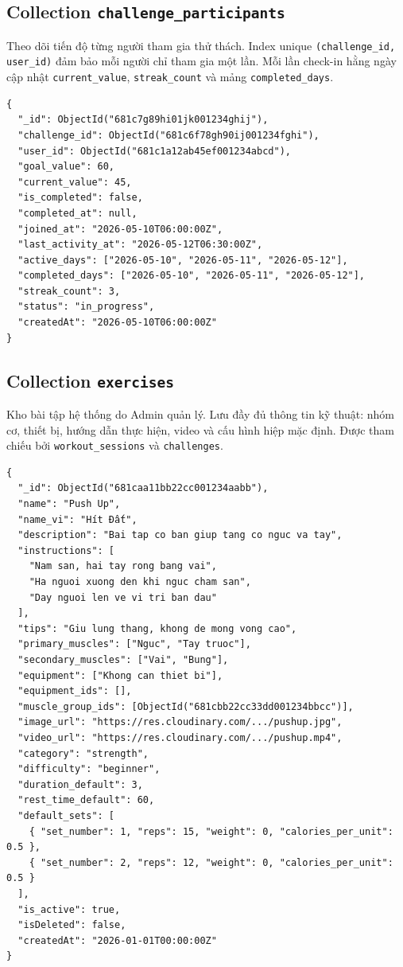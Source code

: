 \subsection{Collection \texttt{challenge\_participants}}
\label{subsec:col_challenge_participants}

Theo dõi tiến độ từng người tham gia thử thách. Index unique \texttt{(challenge\_id, user\_id)} đảm bảo mỗi người chỉ tham gia một lần. Mỗi lần check-in hằng ngày cập nhật \texttt{current\_value}, \texttt{streak\_count} và mảng \texttt{completed\_days}.

\begin{verbatim}
{
  "_id": ObjectId("681c7g89hi01jk001234ghij"),
  "challenge_id": ObjectId("681c6f78gh90ij001234fghi"),
  "user_id": ObjectId("681c1a12ab45ef001234abcd"),
  "goal_value": 60,
  "current_value": 45,
  "is_completed": false,
  "completed_at": null,
  "joined_at": "2026-05-10T06:00:00Z",
  "last_activity_at": "2026-05-12T06:30:00Z",
  "active_days": ["2026-05-10", "2026-05-11", "2026-05-12"],
  "completed_days": ["2026-05-10", "2026-05-11", "2026-05-12"],
  "streak_count": 3,
  "status": "in_progress",
  "createdAt": "2026-05-10T06:00:00Z"
}
\end{verbatim}

\subsection{Collection \texttt{exercises}}
\label{subsec:col_exercises}

Kho bài tập hệ thống do Admin quản lý. Lưu đầy đủ thông tin kỹ thuật: nhóm cơ, thiết bị, hướng dẫn thực hiện, video và cấu hình hiệp mặc định. Được tham chiếu bởi \texttt{workout\_sessions} và \texttt{challenges}.

\begin{verbatim}
{
  "_id": ObjectId("681caa11bb22cc001234aabb"),
  "name": "Push Up",
  "name_vi": "Hít Đất",
  "description": "Bai tap co ban giup tang co nguc va tay",
  "instructions": [
    "Nam san, hai tay rong bang vai",
    "Ha nguoi xuong den khi nguc cham san",
    "Day nguoi len ve vi tri ban dau"
  ],
  "tips": "Giu lung thang, khong de mong vong cao",
  "primary_muscles": ["Nguc", "Tay truoc"],
  "secondary_muscles": ["Vai", "Bung"],
  "equipment": ["Khong can thiet bi"],
  "equipment_ids": [],
  "muscle_group_ids": [ObjectId("681cbb22cc33dd001234bbcc")],
  "image_url": "https://res.cloudinary.com/.../pushup.jpg",
  "video_url": "https://res.cloudinary.com/.../pushup.mp4",
  "category": "strength",
  "difficulty": "beginner",
  "duration_default": 3,
  "rest_time_default": 60,
  "default_sets": [
    { "set_number": 1, "reps": 15, "weight": 0, "calories_per_unit": 0.5 },
    { "set_number": 2, "reps": 12, "weight": 0, "calories_per_unit": 0.5 }
  ],
  "is_active": true,
  "isDeleted": false,
  "createdAt": "2026-01-01T00:00:00Z"
}
\end{verbatim}

